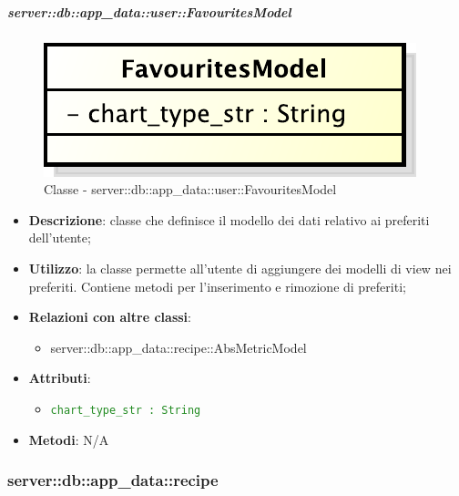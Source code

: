 		\subparagraph{server::db::app\_data::user::FavouritesModel} %
		\label{subp:server_db_app_data_user_favorites}
			\begin{figure}[htbp]
				\centering
				\centerline{\includegraphics[scale=0.75]{./images/server/classes/db/favourites_model.pdf}}
				\caption{Classe - server::db::app\_data::user::FavouritesModel}
			\end{figure}
			\begin{itemize}
				\item \textbf{Descrizione}: classe che definisce il modello dei dati relativo ai preferiti dell'utente;
				\item \textbf{Utilizzo}: la classe  permette all'utente di aggiungere dei modelli di view nei preferiti. Contiene metodi per l'inserimento e rimozione di preferiti;
				\item \textbf{Relazioni con altre classi}:
					\begin{itemize}
						\item server::db::app\_data::recipe::AbsMetricModel
					\end{itemize}
				\item \textbf{Attributi}:
					\begin{itemize}
						\item \textcolor{forestgreen}{\texttt{chart\_type\_str : String}}
					\end{itemize}
				\item \textbf{Metodi}: N/A
			\end{itemize}


\subsubsection{server::db::app\_data::recipe} %
\label{ssub:bdsm_app_server_app_data_recipe}


